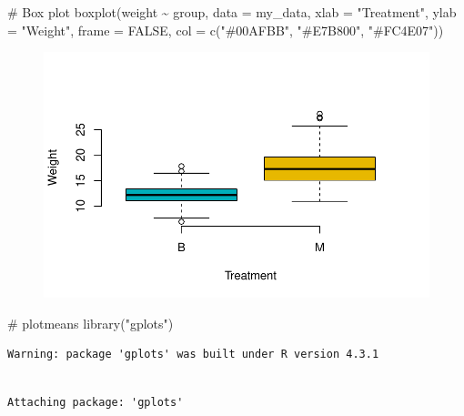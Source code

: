 \documentclass[
  letterpaper,
  DIV=11,
  numbers=noendperiod]{scrartcl}
\newenvironment{Shaded}{\begin{snugshade}}{\end{snugshade}}
\newcommand{\AttributeTok}[1]{\textcolor[rgb]{0.40,0.45,0.13}{#1}}
\newcommand{\CommentTok}[1]{\textcolor[rgb]{0.37,0.37,0.37}{#1}}
\newcommand{\ConstantTok}[1]{\textcolor[rgb]{0.56,0.35,0.01}{#1}}
\newcommand{\FunctionTok}[1]{\textcolor[rgb]{0.28,0.35,0.67}{#1}}
\newcommand{\NormalTok}[1]{\textcolor[rgb]{0.00,0.23,0.31}{#1}}
\newcommand{\SpecialCharTok}[1]{\textcolor[rgb]{0.37,0.37,0.37}{#1}}
\newcommand{\StringTok}[1]{\textcolor[rgb]{0.13,0.47,0.30}{#1}}
\begin{document}
\begin{Shaded}
\begin{Highlighting}[]
\CommentTok{\# Box plot}
\FunctionTok{boxplot}\NormalTok{(weight }\SpecialCharTok{\textasciitilde{}}\NormalTok{ group, }\AttributeTok{data =}\NormalTok{ my\_data,}
        \AttributeTok{xlab =} \StringTok{"Treatment"}\NormalTok{, }\AttributeTok{ylab =} \StringTok{"Weight"}\NormalTok{,}
        \AttributeTok{frame =} \ConstantTok{FALSE}\NormalTok{, }\AttributeTok{col =} \FunctionTok{c}\NormalTok{(}\StringTok{"\#00AFBB"}\NormalTok{, }\StringTok{"\#E7B800"}\NormalTok{, }\StringTok{"\#FC4E07"}\NormalTok{))}
\end{Highlighting}
\end{Shaded}

\begin{figure}[H]

{\centering \includegraphics{ANOVA_files/figure-pdf/unnamed-chunk-5-2.pdf}

}

\end{figure}

\begin{Shaded}
\begin{Highlighting}[]
\CommentTok{\# plotmeans}
\FunctionTok{library}\NormalTok{(}\StringTok{"gplots"}\NormalTok{)}
\end{Highlighting}
\end{Shaded}

\begin{verbatim}
Warning: package 'gplots' was built under R version 4.3.1
\end{verbatim}

\begin{verbatim}

Attaching package: 'gplots'
\end{verbatim}
\end{document}
